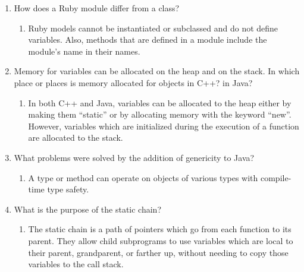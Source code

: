 \begin{enumerate}
\begin{answer}
    \end{answer}
  \item How does a Ruby module differ from a class?

  
    \begin{answer}

    \begin{enumerate}
    \item Ruby models cannot be instantiated or subclassed and do not define variables. 
Also, methods that are defined in a module include the module’s name in their names.
    \end{enumerate}

    \end{answer}

  \item Memory for variables can be allocated on the heap
    and on the stack. In which place or places is memory
    allocated for objects in C++? in Java?

  
    \begin{answer}

    \begin{enumerate}
    \item In both C++ and Java, variables can be allocated to the heap either
 by making them “static” or by allocating memory with the keyword “new”.
 However, variables which are initialized during the execution of a function are
 allocated to the stack.
    \end{enumerate}

    \end{answer}

  \item What problems were solved by the addition
    of genericity to Java?

  
    \begin{answer}

    \begin{enumerate}
    \item A type or method can operate on objects of various types with compile-time type safety. 
    \end{enumerate}

    \end{answer}
  \item What is the purpose of the static chain?


    \begin{answer}

    \begin{enumerate}
    \item The static chain is a path of pointers which go from each function to its parent. 
They allow child subprograms to use variables which are local to their parent, grandparent,
 or farther up, without needing to copy those variables to the call stack.
 

\end{enumerate}
\end{answer}
\end{enumerate}
